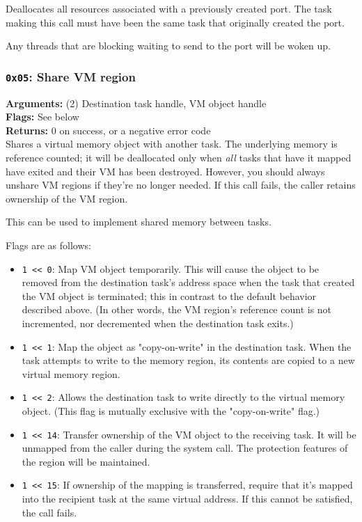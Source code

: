 \documentclass[11pt]{article}
\begin{document}
Deallocates all resources associated with a previously created port. The task making this call must have been the same task that originally created the port.

Any threads that are blocking waiting to send to the port will be woken up.

\subsubsection{{\tt 0x05}: Share VM region}
\textbf{Arguments:} (2) Destination task handle, VM object handle \\
\textbf{Flags:} See below \\
\textbf{Returns:} 0 on success, or a negative error code \\

Shares a virtual memory object with another task. The underlying memory is reference counted; it will be deallocated only when \textit{all} tasks that have it mapped have exited and their VM has been destroyed. However, you should always unshare VM regions if they're no longer needed. If this call fails, the caller retains ownership of the VM region.

This can be used to implement shared memory between tasks.

Flags are as follows:

\begin{itemize}
\item \texttt{1 << 0}: Map VM object temporarily. This will cause the object to be removed from the destination task's address space when the task that created the VM object is terminated; this in contrast to the default behavior described above. (In other words, the VM region's reference count is not incremented, nor decremented when the destination task exits.)
\item \texttt{1 << 1}: Map the object as "copy-on-write" in the destination task. When the task attempts to write to the memory region, its contents are copied to a new virtual memory region.
\item \texttt{1 << 2}: Allows the destination task to write directly to the virtual memory object. (This flag is mutually exclusive with the "copy-on-write" flag.)
\item \texttt{1 << 14}: Transfer ownership of the VM object to the receiving task. It will be unmapped from the caller during the system call. The protection features of the region will be maintained.
\item \texttt{1 << 15}: If ownership of the mapping is transferred, require that it's mapped into the recipient task at the same virtual address. If this cannot be satisfied, the call fails.
\end{itemize}
\end{document}
